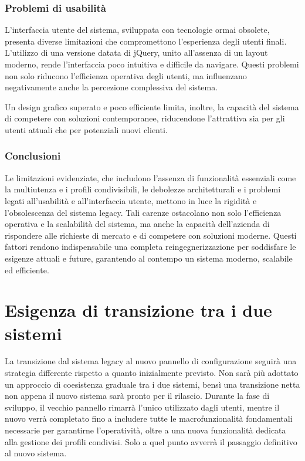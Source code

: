 \subsubsection{Problemi di usabilità}
L'interfaccia utente del sistema, sviluppata con tecnologie ormai obsolete, presenta diverse limitazioni che compromettono l’esperienza degli utenti finali. L’utilizzo di una versione datata di jQuery, unito all’assenza di un layout moderno, rende l’interfaccia poco intuitiva e difficile da navigare. Questi problemi non solo riducono l’efficienza operativa degli utenti, ma influenzano negativamente anche la percezione complessiva del sistema.

Un design grafico superato e poco efficiente limita, inoltre, la capacità del sistema di competere con soluzioni contemporanee, riducendone l’attrattiva sia per gli utenti attuali che per potenziali nuovi clienti.

\subsubsection{Conclusioni}
Le limitazioni evidenziate, che includono l’assenza di funzionalità essenziali come la multiutenza e i profili condivisibili, le debolezze architetturali e i problemi legati all’usabilità e all’interfaccia utente, mettono in luce la rigidità e l'obsolescenza del sistema legacy. Tali carenze ostacolano non solo l'efficienza operativa e la scalabilità del sistema, ma anche la capacità dell'azienda di rispondere alle richieste di mercato e di competere con soluzioni moderne. Questi fattori rendono indispensabile una completa reingegnerizzazione per soddisfare le esigenze attuali e future, garantendo al contempo un sistema moderno, scalabile ed efficiente.

\section{Esigenza di transizione tra i due sistemi}\label{sec:transizione}
La transizione dal sistema legacy al nuovo pannello di configurazione seguirà una strategia differente rispetto a quanto inizialmente previsto. Non sarà più adottato un approccio di coesistenza graduale tra i due sistemi, bensì una transizione netta non appena il nuovo sistema sarà pronto per il rilascio. Durante la fase di sviluppo, il vecchio pannello rimarrà l’unico utilizzato dagli utenti, mentre il nuovo verrà completato fino a includere tutte le macrofunzionalità fondamentali necessarie per garantirne l’operatività, oltre a una nuova funzionalità dedicata alla gestione dei profili condivisi. Solo a quel punto avverrà il passaggio definitivo al nuovo sistema.

